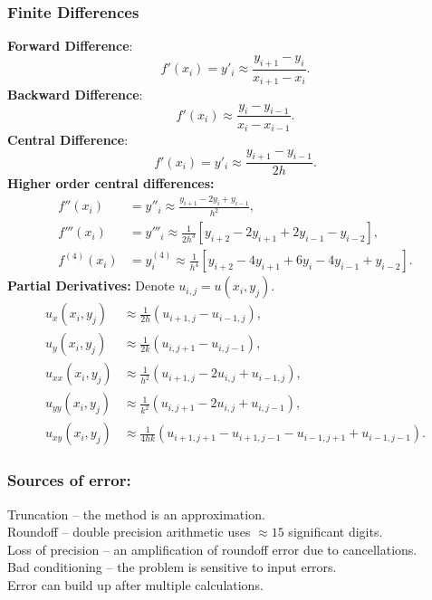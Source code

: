 \subsubsection*{Finite Differences}
{\bf Forward Difference}:
$$
f'(x_i) = y'_i \approx \frac{y_{i+1} - y_i}{x_{i+1}-x_i}.
$$
{\bf Backward Difference}:
$$
f'(x_i) \approx \frac{y_i - y_{i-1}}{x_i-x_{i-1}}.
$$
{\bf Central Difference}:
$$
f'(x_i) = y'_i \approx \frac{y_{i+1} - y_{i-1}}{2h}.
$$
{\bf Higher order central differences:}
\begin{align*}
f''(x_i) &= y''_i \approx \frac{y_{i+1} - 2 y_i + y_{i-1}}{h^2},\\
f'''(x_i) &= y'''_i \approx \frac{1}{2 h^3}
		\left[y_{i+2} - 2y_{i+1} + 2y_{i-1} - y_{i-2} \right] ,\\
f^{(4)}(x_i) &= y^{(4)}_i \approx
        \frac{1}{h^4}
    \left[y_{i+2} - 4y_{i+1} + 6y_i - 4y_{i-1} + y_{i-2} \right] .
\end{align*}
%
{\bf Partial Derivatives:}
Denote $ u_{i,j} = u(x_i,y_j)$.
\begin{align*}
u_x(x_i,y_j) &\approx \frac{1}{2h}
                      \left( u_{i+1,j} - u_{i-1,j} \right),\\
u_y(x_i,y_j) &\approx \frac{1}{2k}
                      \left( u_{i,j+1} - u_{i,j-1} \right),\\
u_{xx}(x_i,y_j) &\approx \frac{1}{h^2}
                    \left( u_{i+1,j} -2u_{i,j} + u_{i-1,j} \right) ,\\
u_{yy}(x_i,y_j) &\approx \frac{1}{k^2}
                    \left( u_{i,j+1} -2u_{i,j} + u_{i,j-1} \right) ,\\
u_{xy}(x_i,y_j) &\approx \frac{1}{4hk}
  \left( u_{i+1,j+1} - u_{i+1,j-1} - u_{i-1,j+1} + u_{i-1,j-1} \right) .
\end{align*}


\subsubsection*{Sources of error:}
Truncation -- the method is an approximation.\\
Roundoff -- double precision arithmetic uses $\approx 15$ significant digits.\\
Loss of precision -- an amplification of roundoff error due to cancellations.\\
Bad conditioning -- the problem is sensitive to input errors.\\
Error can build up after multiple calculations.\\

